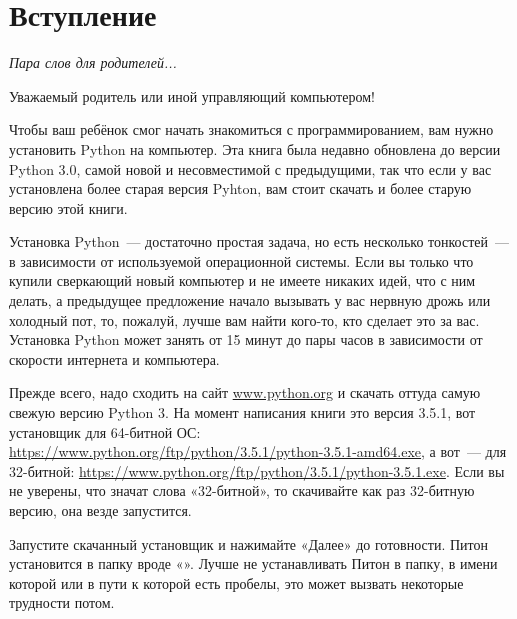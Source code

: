 

\chapter*{Вступление}\normalsize
\begin{center}
{\em Пара слов для родителей...}
\end{center}
\pagestyle{plain}

Уважаемый родитель или иной управляющий компьютером!

Чтобы ваш ребёнок смог начать знакомиться с программированием, вам нужно установить Python на компьютер. Эта книга была недавно обновлена до версии Python 3.0, самой новой и несовместимой с предыдущими, так что если у вас установлена более старая версия Pyhton, вам стоит скачать и более старую версию этой книги.

Установка Python — достаточно простая задача, но есть несколько тонкостей — в зависимости от используемой операционной системы. Если вы только что купили сверкающий новый компьютер и не имеете никаких идей, что с ним делать, а предыдущее предложение начало вызывать у вас нервную дрожь или холодный пот, то, пожалуй, лучше вам найти кого-то, кто сделает это за вас. Установка Python может занять от 15 минут до пары часов в зависимости от скорости интернета и компьютера.

\begin{WINDOWS}
	
Прежде всего, надо сходить на сайт \href{http://www.python.org}{www.python.org} и скачать оттуда самую свежую версию Python 3. На момент написания книги это версия 3.5.1, вот установщик для 64-битной ОС: \url{https://www.python.org/ftp/python/3.5.1/python-3.5.1-amd64.exe}, а вот — для 32-битной: \url{https://www.python.org/ftp/python/3.5.1/python-3.5.1.exe}. Если вы не уверены, что значат слова «32-битной», то скачивайте как раз 32-битную версию, она везде запустится.

Запустите скачанный установщик и нажимайте «Далее» до готовности. Питон установится в папку вроде «». Лучше не устанавливать Питон в папку, в имени которой или в пути к которой есть пробелы, это может вызвать некоторые трудности потом.
	
\end{WINDOWS}

